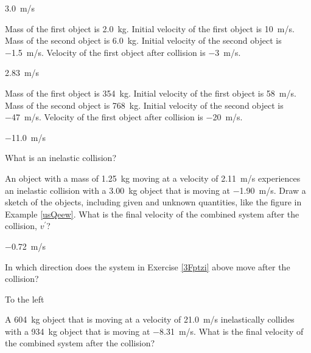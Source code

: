 \documentclass[../main-physics-problems.tex]{subfiles}
\begin{document}
\begin{questions}
\begin{solution}
\SI{3.0}{m/s}
\end{solution}


\question \label{O4Og7L} %
Mass of the first object is \SI{2.0}{kg}.
Initial velocity of the first object is \SI{10}{m/s}. 
Mass of the second object is \SI{6.0}{kg}. 
Initial velocity of the second object is \SI{-1.5}{m/s}. 
Velocity of the first object after collision is \SI{-3}{m/s}.

\begin{solution}
\SI{2.83}{m/s}
\end{solution}

\question \label{6yR4Xo} %
Mass of the first object is \SI{354}{kg}.
Initial velocity of the first object is \SI{58}{m/s}. 
Mass of the second object is \SI{768}{kg}. 
Initial velocity of the second object is \SI{-47}{m/s}. 
Velocity of the first object after collision is \SI{-20}{m/s}.

\begin{solution}
\SI{-11.0}{m/s}
\end{solution}



\question \label{Hjk6xk}
What is an inelastic collision?


\question \label{3Fptzi}
An object with a mass of \SI{1.25}{kg} moving at a velocity of \SI{2.11}{m/s} experiences an inelastic collision with a \SI{3.00}{kg} object that is moving at \SI{-1.90}{m/s}. Draw a sketch of the objects, including given and unknown quantities, like the figure in Example \ref{usQeew}. What is the final velocity of the combined system after the collision, $v^{\prime}$? 

\begin{solution}
\SI{-0.72}{m/s}
\end{solution}


\question \label{17GLnY}
In which direction does the system in Exercise \ref{3Fptzi} above move after the collision?

\begin{solution}
To the left
\end{solution}


\question \label{yJLtfh}
A \SI{604}{kg} object that is moving at a velocity of \SI{21.0}{m/s} inelastically collides with a \SI{934}{kg} object that is moving at \SI{-8.31}{m/s}. What is the final velocity of the combined system after the collision?


\end{questions}
\end{document}
